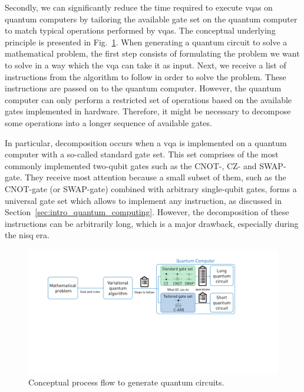 Secondly, we  can significantly reduce the time required to execute \glspl{vqa} on quantum computers by tailoring the available gate set on the quantum computer to match typical operations performed by \glspl{vqa}. The conceptual underlying principle is presented in Fig.~\ref{fig:intro_quantum_circuits}. When generating a quantum circuit to solve a mathematical problem, the first step consists of formulating the problem we want to solve in a way which the \gls{vqa} can take it as input. Next, we receive a list of instructions from the algorithm to follow in order to solve the problem. These instructions are passed on to the quantum computer. However, the quantum computer can only perform a restricted set of operations based on the available gates implemented in hardware. Therefore, it might be necessary to decompose some operations into a longer sequence of available gates.

In particular, decomposition occurs when a \gls{vqa} is implemented on a quantum computer with a so-called standard gate set. This set comprises of the most commonly implemented two-qubit gates such as the CNOT-, CZ- and SWAP-gate. They receive most attention because a small subset of them, such as the CNOT-gate (or SWAP-gate) combined with arbitrary single-qubit gates, forms a universal gate set which allows to implement any instruction, as discussed in Section~\ref{sec:intro_quantum_computing}. However, the decomposition of these instructions can be arbitrarily long, which is a major drawback, especially during the \gls{nisq} era.

\begin{figure}[ht]
    \centering
    \includegraphics[width=\textwidth, trim={5cm 18cm 10cm 2cm},clip]{quantum_circuits_v3.pdf}
    \caption{Conceptual process flow to generate quantum circuits.}
    \label{fig:intro_quantum_circuits}
\end{figure}%

